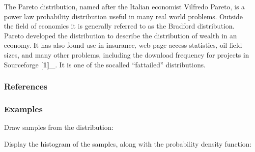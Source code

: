\documentclass[letterpaper,10pt,english]{sphinxmanual}
\begin{document}
\begin{fulllineitems}
\sphinxAtStartPar
The Pareto distribution, named after the Italian economist
Vilfredo Pareto, is a power law probability distribution
useful in many real world problems.  Outside the field of
economics it is generally referred to as the Bradford
distribution. Pareto developed the distribution to describe
the distribution of wealth in an economy.  It has also found
use in insurance, web page access statistics, oil field sizes,
and many other problems, including the download frequency for
projects in Sourceforge {\color{red}\bfseries{}{[}1{]}\_}.  It is one of the so\sphinxhyphen{}called
“fat\sphinxhyphen{}tailed” distributions.
\subsubsection*{References}
\subsubsection*{Examples}

\sphinxAtStartPar
Draw samples from the distribution:

\begin{sphinxVerbatim}[commandchars=\\\{\}]
      
       
\end{sphinxVerbatim}

\sphinxAtStartPar
Display the histogram of the samples, along with the probability
density function:

\begin{sphinxVerbatim}[commandchars=\\\{\}]
   
      
    
   
\end{sphinxVerbatim}


\end{fulllineitems}
\end{document}
